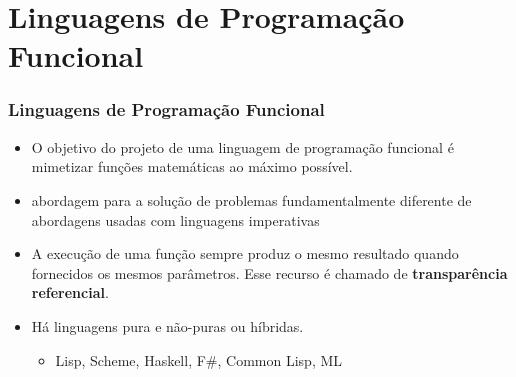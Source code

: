 \section{Linguagens de Programação Funcional}

\begin{frame}
	\frametitle{Linguagens de Programação Funcional}
	\begin{itemize}
		\item O objetivo do projeto de uma linguagem de programação funcional é mimetizar funções matemáticas ao máximo possível.
		\item abordagem para a solução de problemas fundamentalmente diferente de abordagens usadas com linguagens imperativas
		\item A execução de uma função sempre produz o 
    mesmo resultado quando fornecidos os mesmos parâmetros. Esse recurso 
    é chamado de \textbf{transparência referencial}.
    \item Há linguagens pura e não-puras ou híbridas.
    \begin{itemize}
      \item Lisp, Scheme, Haskell, F\#, Common Lisp, ML
    \end{itemize}
	\end{itemize}
\end{frame}


